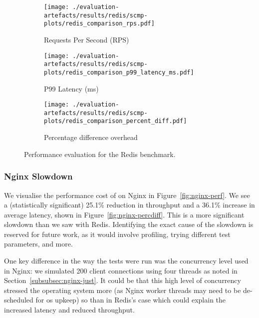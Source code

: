 \begin{figure}[htbp]
    \centering
    \begin{subfigure}[b]{\textwidth}
        \centering
        \texttt{[image: ./evaluation-artefacts/results/redis/scmp-plots/redis\_comparison\_rps.pdf]} 
        \caption{Requests Per Second (RPS)}
        \label{fig:redis-rps}
    \end{subfigure}
    \hfill
     \begin{subfigure}[b]{\textwidth}
        \centering
        \texttt{[image: ./evaluation-artefacts/results/redis/scmp-plots/redis\_comparison\_p99\_latency\_ms.pdf]} 
        \caption{P99 Latency (ms)}
        \label{fig:redis-p99}
    \end{subfigure}
    
     \medskip 
     \begin{subfigure}[b]{1.2\textwidth}
        \centering
        \texttt{[image: ./evaluation-artefacts/results/redis/scmp-plots/redis\_comparison\_percent\_diff.pdf]} %
        \caption{Percentage difference overhead}
        \label{fig:redis-percdiff}
    \end{subfigure}

    \caption{Performance evaluation for the Redis benchmark.}
    \label{fig:redis-perf}
\end{figure}

\subsubsection{Nginx Slowdown}\label{subsubsec:nginx-slowdown}

We visualise the performance cost of \af on Nginx in
Figure~\ref{fig:nginx-perf}. We see a (statistically significant) 25.1\%
reduction in throughput and a 36.1\% increase in average latency, shown in
Figure~\ref{fig:nginx-percdiff}. This is a more significant slowdown than
we saw with Redis. Identifying the exact cause of the slowdown is reserved
for future work, as it would involve profiling, trying different test
parameters, and more. 

One key difference in the way the tests were run was the concurrency level used
in Nginx: we simulated 200 client connections using four threads as noted in
Section~\ref{subsubsec:nginx-just}. It could be that this high level of
concurrency stressed the operating system more (as Nginx worker threads may need
to be de-scheduled for \ac{os} upkeep) so than in Redis's case which could
explain the increased latency and reduced throughput.

